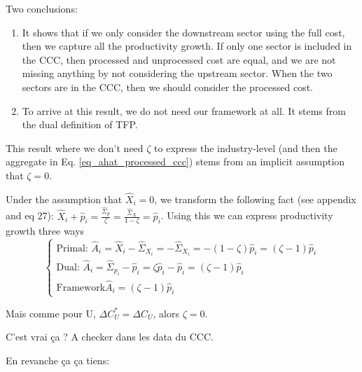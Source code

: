 \documentclass[11pt]{article}
\begin{document}
Two conclusions: 
\begin{enumerate}
    \item It shows that if we only consider the downstream sector using the full cost, then we capture all the productivity growth. If only one sector is included in the CCC, then processed and unprocessed cost are equal, and we are not missing anything by not considering the upstream sector. When the two sectors are in the CCC, then we should consider the processed cost.
    \item To arrive at this result, we do not need our framework at all. It stems from the dual definition of TFP. 
\end{enumerate}





\newpage



This result where we don't need $\zeta$ to express the industry-level (and then the aggregate in Eq. \ref{eq_ahat_processed_ccc}) stems from an implicit assumption that $\zeta=0$.

Under the assumption that $\hat{X}_i=0$, we transform the following fact (see appendix and eq 27):  $\hat{X}_i + \hat{p}_i = \frac{\hat{\Sigma}_p}{\zeta} = \frac{\hat{\Sigma}_X}{1-\zeta}=\hat{p}_i$. Using this we can express productivity growth three ways
\begin{equation*}
    \begin{cases}
    \text{Primal: } \hat{A}_i=\hat{X}_i - \hat{\Sigma}_{X_i}=-\hat{\Sigma}_{X_i}=-(1-\zeta) \hat{p}_i=(\zeta-1) \hat{p}_i\\
    \text{Dual: } \hat{A}_i=\hat{\Sigma}_{p_i} - \hat{p}_i=\zeta \hat{p}_i- \hat{p}_i=(\zeta-1) \hat{p}_i\\
       \text{Framework} \hat{A}_i=(\zeta-1)\hat{p}_i
\end{cases}
\end{equation*}


Mais comme pour U, $  \Delta C^*_U=\Delta C_U$, alors $\zeta=0$. 

C'est vrai ça ? A checker dans les data du CCC. 


En revanche ça ça tiens:
\end{document}
